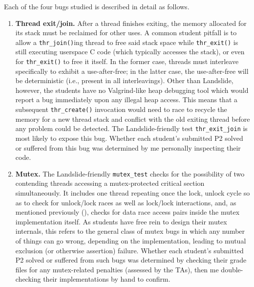 Each of the four bugs studied is described in detail as follows.

\begin{enumerate}
\item
{\bf Thread exit/join.}
After a thread finishes exiting, the memory allocated for its stack must be reclaimed for other uses.
A common student pitfall is to allow a {\tt thr\_join()}ing thread to free said stack space
while {\tt thr\_exit()} is still executing userspace C code (which typically accesses the stack),
or even for {\tt thr\_exit()} to free it itself.
In the former case, threads must interleave specifically to exhibit a use-after-free;
in the latter case, the use-after-free will be deterministic (i.e., present in all interleavings).
Other than Landslide, however,
the students have no Valgrind-like heap debugging tool which would report a bug immediately upon any illegal heap access.
This means that a subsequent {\tt thr\_create()} invocation would need to race to recycle the memory for a new thread stack
and conflict with the old exiting thread
before any problem could be detected.
The Landslide-friendly test {\tt thr\_exit\_join} is most likely to expose this bug.
Whether each student's submitted P2 solved or suffered from this bug
was determined by me personally inspecting their code.
%

\item
{\bf Mutex.}
The Landslide-friendly {\tt mutex\_test} checks for the possibility of two contending threads
accessing a mutex-protected critical section simultaneously.
It includes one thread repeating once the lock, unlock cycle
so as to check for unlock/lock races as well as lock/lock interactions,
and, as mentioned previously (\sect{\ref{sec:education-pebbles-tests}}),
checks for data race access pairs inside the mutex implementation itself.
As students have free rein to design their mutex internals,
this refers to the general class of mutex bugs
in which any number of things can go wrong, depending on the implementation,
leading to mutual exclusion (or otherwise assertion) failure.
Whether each student's submitted P2 solved or suffered from such bugs
was determined by checking their grade files for any mutex-related penalties (assessed by the TAs),
then me double-checking their implementations by hand to confirm.


\end{enumerate}
